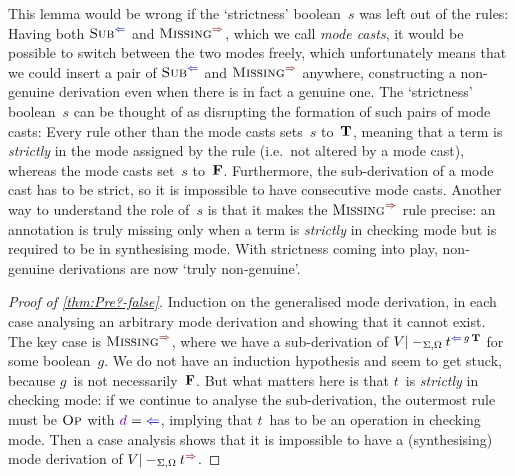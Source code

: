 This lemma would be wrong if the `strictness' boolean~$s$ was left out of the rules:
Having both $\ChkRule{Sub}$ and $\SynRule{Missing}$, which we call \emph{mode casts}, it would be possible to switch between the two modes freely, which unfortunately means that we could insert a pair of $\ChkRule{Sub}$ and $\SynRule{Missing}$ anywhere, constructing a non-genuine derivation even when there is in fact a genuine one.
The `strictness' boolean~$s$ can be thought of as disrupting the formation of such pairs of mode casts:
Every rule other than the mode casts sets~$s$ to~$\mathbf{T}$, meaning that a term is \emph{strictly} in the mode assigned by the rule (i.e.~not altered by a mode cast), whereas the mode casts set~$s$ to~$\mathbf{F}$.
Furthermore, the sub-derivation of a mode cast has to be strict, so it is impossible to have consecutive mode casts.
Another way to understand the role of~$s$ is that it makes the $\SynRule{Missing}$ rule precise: an annotation is truly missing only when a term is \emph{strictly} in checking mode but is required to be in synthesising mode.
With strictness coming into play, non-genuine derivations are now `truly non-genuine'.

\begin{proof}[Proof of \cref{thm:Pre?-false}]
Induction on the generalised mode derivation, in each case analysing an arbitrary mode derivation and showing that it cannot exist.
The key case is $\SynRule{Missing}$, where we have a sub-derivation of $V |-_{\Sigma,\Omega} t^{\chk\,g\,\True}$ for some boolean~$g$.
We do not have an induction hypothesis and seem to get stuck, because $g$~is not necessarily~$\mathbf{F}$.
But what matters here is that $t$~is \emph{strictly} in checking mode: if we continue to analyse the sub-derivation, the outermost rule must be $\textnormal{\textsc{Op}}$ with $\dir d = {\chk}$, implying that $t$~has to be an operation in checking mode.
Then a case analysis shows that it is impossible to have a (synthesising) mode derivation of $V |-_{\Sigma,\Omega} t^{\syn}$.
\end{proof}

